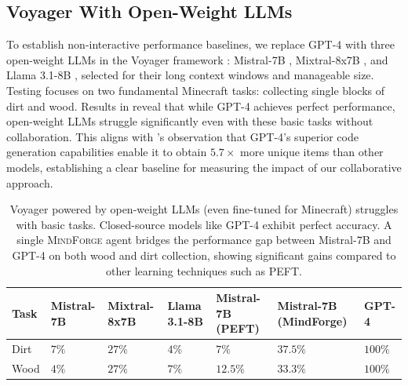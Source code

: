 \documentclass{article}
\newcommand{\collabvoyager}[0]{\mbox{\textsc{MindForge}}\xspace}
\begin{document}
\subsection{Voyager With Open-Weight LLMs}
\label{ssec:baselines}

To establish non-interactive performance baselines, we replace GPT-4 \citep{achiam2023gpt} with three open-weight LLMs in the Voyager framework \citep{wang2023voyager}: Mistral-7B \citep{jiang2023mistral7b}, Mixtral-8x7B \citep{jiang2024mixtral}, and Llama 3.1-8B \citep{dubey2024llama}, selected for their long context windows and manageable size. Testing focuses on two fundamental Minecraft tasks: collecting single blocks of dirt and wood.
Results in  reveal that while GPT-4 achieves perfect performance, open-weight LLMs struggle significantly even with these basic tasks without collaboration. This aligns with \citet{wang2023voyager}'s observation that GPT-4's superior code generation capabilities enable it to obtain $5.7\times$ more unique items than other models, establishing a clear baseline for measuring the impact of our collaborative approach.

\begin{table}[hbt]
    \scriptsize
  \caption{Voyager \cite{wang2023voyager} powered by open-weight LLMs (even fine-tuned for Minecraft) struggles with basic tasks. Closed-source models like GPT-4 exhibit perfect accuracy. A single \collabvoyager agent bridges the performance gap between Mistral-7B and GPT-4 on both wood and dirt collection, showing significant gains compared to other learning techniques such as PEFT.}
    {\tabcolsep=9pt
    \begin{tabularx}{\columnwidth}{@{}>{\arraybackslash}l *6{X}}
      \toprule
      \textbf{Task} & \textbf{Mistral-7B} & \textbf{Mixtral-8x7B} &\textbf{ Llama 3.1-8B} & \textbf{Mistral-7B (PEFT)} & \textbf{Mistral-7B (MindForge)} & \textbf{GPT-4} \\ 
      \midrule
      Dirt & $7\%$ & $27\%$ & $4\%$ & $7\%$ & $37.5\%$ & $100\%$ \\
      Wood & $4\%$ & $27\%$ & $7\%$ & $12.5\%$ &  $33.3\%$ &$100\%$ \\
      \bottomrule
    \end{tabularx}}
    \label{table:voyager-base}
\end{table}
\end{document}
